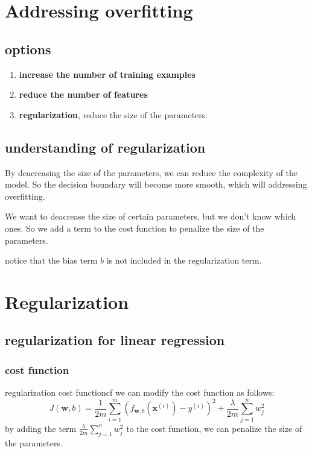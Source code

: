 \section{Addressing overfitting}
\subsection*{options}
\begin{enumerate}
    \item \textbf{increase the number of training examples}
    \item \textbf{reduce the number of features}
    \item \textbf{regularization}, reduce the size of the parameters.
\end{enumerate}

\subsection*{understanding of regularization}
\hspace{2em}By deacreasing the size of the parameters, 
we can reduce the complexity of the model. So the decision boundary will become more smooth,
which will addressing overfitting.\par
\hspace{2em}We want to deacrease the size of certain parameters,
 but we don't know which ones.
  So we add a term to the cost function to penalize the size of the parameters.\\

\begin{notebox}
    notice that the bias term $b$ is not included in the regularization term.
\end{notebox}

\section{Regularization}
\subsection{regularization for linear regression}
\subsubsection*{cost function}
\begin{thmbox}{regularization cost function}{cf}
    we can modify the cost function as follows:
    \begin{equation}
        J(\mathbf{w}, b) = \frac{1}{2m}\sum_{i=1}^{m}\left(f_{\mathbf{w}, b}\left(\mathbf{x}^{(i)}\right) - y^{(i)}\right)^2 + \frac{\lambda}{2m}\sum_{j=1}^{n}w_j^2
    \end{equation}
    by adding the term $\frac{\lambda}{2m}\sum_{j=1}^{n}w_j^2$ to the cost function, we can penalize the size of the parameters.
\end{thmbox}

